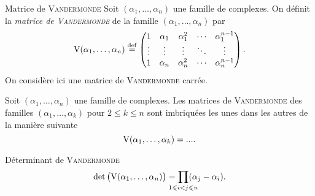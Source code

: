 \begin{defi}{Matrice de \textsc{Vandermonde}}
    Soit $(\alpha_1, \dots, \alpha_n)$ une famille de complexes. On définit la \emph{matrice de \textsc{Vandermonde}} de la famille $(\alpha_1, \dots, \alpha_n)$ par
    $$\mathrm{V}(\alpha_1, \dots, \alpha_n) \overset{\mathrm{\tiny def}}{=} \begin{pmatrix}
    1 & \alpha_1 & \alpha_1^2 & \cdots & \alpha_1^{n-1} \\
    \vdots & \vdots & \vdots & \ddots & \vdots \\
    1 & \alpha_n & \alpha_n^2 & \cdots & \alpha_n^{n-1}
    \end{pmatrix}.$$
    On considère ici une matrice de \textsc{Vandermonde} carrée.
\end{defi}

\newcommand{\vandk}{
\left(\begin{gathered}
    [every node/.style={anchor=south west}]
        \node[mitikzpicturenimum width=2cm,minimum height=1.5cm] at (-0.16,0.625) {$\Vandermonde(\alpha_1, \dots, \alpha_{k-1})$};
        \node[minimum width=0.5cm,minimum height=0.5cm] at (0,0.05) {$1$};
        \node[minimum width=0.5cm,minimum height=0.5cm] at (0.4, 0) {$\alpha_{k}$};
        \node[minimum width=0.5cm,minimum height=0.5cm] at (0.95,0) {$\cdots$};
        \node[minimum width=0.5cm,minimum height=0.5cm] at (1.5,0) {$\alpha_{k}^{k-2}$};
        \node[minimum width=1cm,minimum height=0.5cm] at (2.5,0) {$\alpha_{k}^{k-1}$};
        \node[minimum width=1cm,minimum height=1cm] at (2.5,0.4) {$\alpha_{k-1}^{k-1}$};
        \node[minimum width=1cm,minimum height=1cm] at (2.5,1) {$\vdots$};
        \node[minimum width=1cm,minimum height=1cm] at (2.5,1.4) {$\alpha_1^{k-1}$};
        \draw (0,0.6) -- (2.5,0.6);
        \draw (2.5,0.6) -- (2.5,2.225);
        \draw[dashed] (2.5,0.6) -- (3.5,0.6);
        \draw[dashed] (2.5,0.6) -- (2.5,0);
    \endtikzpicture
    \end{gathered}\right)
}

\begin{remarque}
    Soit $(\alpha_1, \dots, \alpha_n)$ une famille de complexes. Les matrices de \textsc{Vandermonde} des familles $(\alpha_1, \dots, \alpha_k)$ pour $2 \leqslant k \leqslant n$ sont imbriquées les unes dans les autres de la manière suivante
    $$\mathrm{V}(\alpha_1, \dots, \alpha_k) = ....$$
\end{remarque}

\begin{prop}{Déterminant de \textsc{Vandermonde}} 
    $$\det \big( \Vandermonde(\alpha_1, \dots, \alpha_n) \big) = \smashoperator{\prod_{1\leqslant i < j \leqslant n}}(\alpha_j - \alpha_i).$$
\end{prop}

